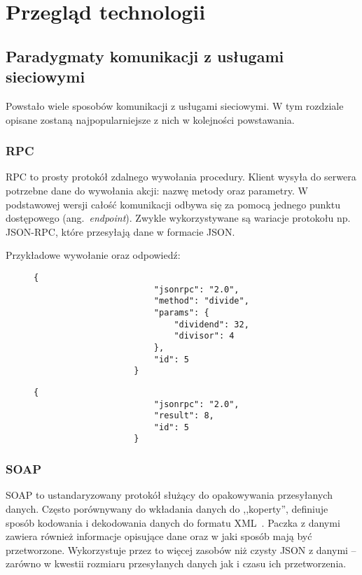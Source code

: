 
\chapter{Przegląd technologii}
\label{sec:przegTech}

\section{Paradygmaty komunikacji z usługami sieciowymi}
	Powstało wiele sposobów komunikacji z usługami sieciowymi.
	W tym rozdziale opisane zostaną najpopularniejsze z nich w kolejności powstawania.

	\subsection{RPC}
		RPC to prosty protokół zdalnego wywołania procedury.
		Klient wysyła do serwera potrzebne dane do wywołania akcji: nazwę metody oraz parametry.
		W podstawowej wersji całość komunikacji odbywa się za pomocą jednego punktu dostępowego (ang.\ \emph{endpoint}).
		Zwykle wykorzystywane są wariacje protokołu np. JSON-RPC, które przesyłają dane w formacie JSON.

		Przykładowe wywołanie oraz odpowiedź:
		\begin{figure}[!htb]
			\centering
			\begin{minipage}{.5\textwidth}
				\begin{lstlisting}[label=lst:rpcReq]
					{
						"jsonrpc": "2.0",
						"method": "divide",
						"params": {
							"dividend": 32,
							"divisor": 4
						},
						"id": 5
					}
				\end{lstlisting}	
			\end{minipage}%
			\begin{minipage}{0.5\textwidth}
				\begin{lstlisting}[label=lst:rpcRes]
					{
						"jsonrpc": "2.0",
						"result": 8,
						"id": 5
					}
				\end{lstlisting}
			\end{minipage}
		\end{figure}

	\subsection{SOAP}
		SOAP to ustandaryzowany protokół służący do opakowywania przesyłanych danych. 
		Często porównywany do wkładania danych do ,,koperty'', definiuje sposób kodowania i dekodowania danych do formatu XML~\cite{SOAP}.
		Paczka z danymi zawiera również informacje opisujące dane oraz w jaki sposób mają być przetworzone.
		Wykorzystuje przez to więcej zasobów niż czysty JSON z danymi -- zarówno w kwestii rozmiaru przesyłanych danych jak i czasu ich przetworzenia.
		
